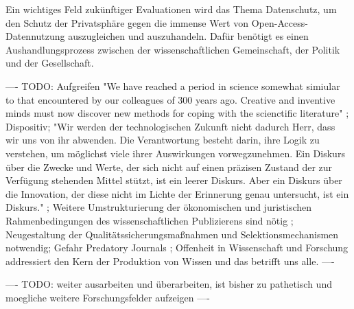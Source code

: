 Ein wichtiges Feld zukünftiger Evaluationen wird das Thema Datenschutz, um den Schutz der Privatsphäre gegen die immense Wert von Open-Access-Datennutzung auszugleichen und auszuhandeln. Dafür benötigt es einen Aushandlungsprozess zwischen der wissenschaftlichen Gemeinschaft, der Politik und der Gesellschaft.

---- TODO: Aufgreifen "We have reached a period in science somewhat simiular to that encountered by our colleagues of 300 years ago. Creative and inventive minds must now discover new methods for coping with the scienctific literature" \cite{porter_1964_scientific}; Dispositiv; "Wir werden der technologischen Zukunft nicht dadurch Herr, dass wir uns von ihr abwenden. Die Verantwortung besteht darin, ihre Logik zu verstehen, um möglichst viele ihrer Auswirkungen vorwegzunehmen. Ein Diskurs über die Zwecke und Werte, der sich nicht auf einen präzisen Zustand der zur Verfügung stehenden Mittel stützt, ist ein leerer Diskurs. Aber ein Diskurs über die Innovation, der diese nicht im Lichte der Erinnerung genau untersucht, ist ein Diskurs." \cite{naeder_2010_open}; Weitere Umstrukturierung der ökonomischen und juristischen Rahmenbedingungen des wissenschaftlichen Publizierens sind nötig \cite{naeder_2010_open};  Neugestaltung der Qualitätssicherungsmaßnahmen und Selektionsmechanismen notwendig; Gefahr Predatory Journals \cite{Beall_2012}; Offenheit in Wissenschaft und Forschung addressiert den Kern der Produktion von Wissen und das betrifft uns alle. \cite{Mussell_2013}  ----

---- TODO: weiter ausarbeiten und überarbeiten, ist bisher zu pathetisch und moegliche weitere Forschungsfelder aufzeigen ----
